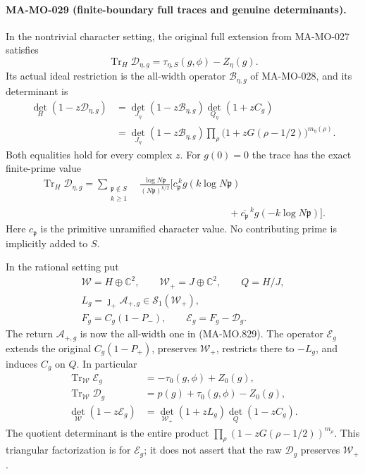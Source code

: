 \paragraph{MA-MO-029 (finite-boundary full traces and genuine determinants).}
In the nontrivial character setting, the original full
extension from MA-MO-027 satisfies
\[
 \operatorname{Tr}_H\mathscr D_{\eta,g}
                 =\tau_{\eta,S}(g,\phi)-Z_\eta(g).
 \tag{MA-MO.851}
\]
Its actual ideal restriction is the all-width operator
\(\mathcal B_{\eta,g}\) of MA-MO-028, and its determinant is
\[
 \begin{aligned}
 \det_H(1-z\mathscr D_{\eta,g})
   &=\det_{J_\eta}(1-z\mathcal B_{\eta,g})
                                \det_{Q_\eta}(1+zC_g)\\
   &=\det_{J_\eta}(1-z\mathcal B_{\eta,g})
       \prod_\rho\bigl(1+zG(\rho-1/2)\bigr)^{m_\eta(\rho)} .
 \end{aligned}
 \tag{MA-MO.852}
\]
Both equalities hold for every complex \(z\).
For \(g(0)=0\) the trace has the exact finite-prime value
\[
 \begin{aligned}
 \operatorname{Tr}_H\mathscr D_{\eta,g}
  =\sum_{\substack{\mathfrak p\notin S\\k\ge1}}
    &\frac{\log N\mathfrak p}{(N\mathfrak p)^{k/2}}
       \bigl[
        c_{\mathfrak p}^{\,k}g(k\log N\mathfrak p)\\
    &\hspace{9em}
       +\overline{c_{\mathfrak p}}^{\,k}g(-k\log N\mathfrak p)
       \bigr].
 \end{aligned}
 \tag{MA-MO.853}
\]
Here \(c_{\mathfrak p}\) is the primitive unramified
character value. No contributing prime is implicitly
added to \(S\).

In the rational setting put
\[
 \begin{gathered}
 \mathcal W=H\oplus\mathbb C^2,\qquad
 \mathcal W_+=J\oplus\mathbb C^2,\qquad Q=H/J,\\
 L_g=\jmath_+\mathcal A_{+,g}\in\mathcal S_1(\mathcal W_+),\\
 F_g=C_g(1-P_-),\qquad
 \mathscr E_g=F_g-\mathscr D_g .
 \end{gathered}
 \tag{MA-MO.854}
\]
The return \(\mathcal A_{+,g}\) is now the all-width
one in (MA-MO.829). The operator \(\mathscr E_g\)
extends the original \(C_g(1-P_+)\), preserves
\(\mathcal W_+\), restricts there to \(-L_g\),
and induces \(C_g\) on \(Q\). In particular
\[
 \begin{aligned}
 \operatorname{Tr}_{\mathcal W}\mathscr E_g
                       &=-\tau_0(g,\phi)+Z_0(g),\\
 \operatorname{Tr}_{\mathcal W}\mathscr D_g
                       &=p(g)+\tau_0(g,\phi)-Z_0(g),\\
 \det_{\mathcal W}(1-z\mathscr E_g)
                       &=\det_{\mathcal W_+}(1+zL_g)
                                          \det_Q(1-zC_g).
 \end{aligned}
 \tag{MA-MO.855}
\]
The quotient determinant is the entire product
\(\prod_\rho(1-zG(\rho-1/2))^{m_\rho}\).
This triangular factorization is for \(\mathscr E_g\);
it does not assert that the raw \(\mathscr D_g\)
preserves \(\mathcal W_+\).

